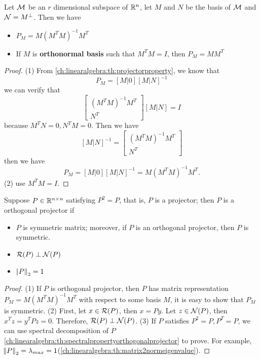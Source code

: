 \begin{refsection}
\begin{theorem}\cite[430]{meyer2000matrix}
Let $\mathcal{M}$ be an $r$ dimensional subspace of $\mathbb{R}^n$, let $M$ and $N$ be the basis of $\mathcal{M}$ and $\mathcal{N} = M^\perp$. Then we have
\begin{itemize}
	\item $P_M = M(M^TM)^{-1}M^T$
	\item If $M$ is \textbf{orthonormal basis} such that $M^TM = I$, then $P_M = MM^T$
\end{itemize}
\end{theorem}
\begin{proof}
(1) From \autoref{ch:linearalgebra:th:projectorproperty}, we know that $$P_M = [M | 0][M | N]^{-1}$$
we can verify that
$$\begin{bmatrix}
(M^TM)^{-1}M^T\\
N^T
\end{bmatrix}[M | N] = I$$
because $M^TN = 0,N^TM = 0$. Then we have
$$[M | N]^{-1} = \begin{bmatrix}
(M^TM)^{-1}M^T\\
N^T
\end{bmatrix}$$
then we have
$$P_M = [M | 0][M | N]^{-1} = M(M^TM)^{-1}M^T.$$
(2) use $M^TM = I$. 
\end{proof}




\begin{theorem}\cite[433]{meyer2000matrix}\label{ch:linearalgebra:th:characterizationoforthogonalprojector}
Suppose $P\in \mathbb{R}^{n\times n}$ satisfying $P^2 = P$, that is, $P$ is a projector;  then $P$ is a orthogonal projector if
\begin{itemize}
	\item $P$ is symmetric matrix; moreover, if $P$ is an orthogonal projector, then $P$ is symmetric.	
	\item $\mathcal{R}(P)\perp \mathcal{N}(P)$
	\item $\norm{P}_2 = 1 $
\end{itemize}
\end{theorem}
\begin{proof}
(1) If $P$ is orthogonal projector, then $P$ has matrix representation $P_M = M(M^TM)^{-1}M^T$ with respect to some basis $M$, it is easy to show that $P_M$ is symmetric.
(2) First, let $x\in \mathcal{R}(P)$, then $x = Py$. Let $z\in \mathcal{N}(P)$, then $x^Tz = y^TPz = 0$. Therefore, $\mathcal{R}(P)\perp \mathcal{N}(P)$. 
(3) If $P$ satisfies $P^2=P, P^T = P$, we can use spectral decomposition of $P$ \autoref{ch:linearalgebra:th:spectralpropertyorthogonalprojector} to prove. For example, $\norm{P}_2 = \lambda_{max} = 1$(\autoref{ch:linearalgebra:th:matrix2normeigenvalue}). 
\end{proof}




\end{refsection}
